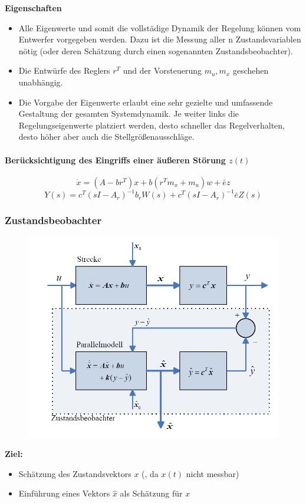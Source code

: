 \documentclass[10pt,a4paper]{article}
\begin{document}
\textbf{Eigenschaften}
\begin{itemize}
	\item Alle Eigenwerte und somit die vollstädige Dynamik der Regelung können vom Entwerfer vorgegeben werden. Dazu ist die Messung aller n Zustandsvariablen nötig (oder deren Schätzung durch einen sogenannten Zustandsbeobachter).
	\item Die Entwürfe des Reglers $r^T$ und der Vorsteuerung $m_u, m_x$ geschehen unabhängig.
	\item Die Vorgabe der Eigenwerte erlaubt eine sehr gezielte und umfassende Gestaltung der gesamten Systemdynamik. Je weiter links die Regelungseigenwerte platziert werden, desto schneller das Regelverhalten, desto höher	aber auch die Stellgrößenausschläge.
\end{itemize}

\paragraph{Berücksichtigung des Eingriffs einer äußeren Störung $z(t)$}
$$
	\dot x = (A - br^T) x + b (r^T m_x + m_u) w + \bar e z
$$
$$
	Y(s) = c^T(sI-A_r)^{-1}b_rW(s) + c^T(sI-A_r)^{-1}\bar eZ(s)
$$

\subsubsection{Zustandsbeobachter}
\begin{figure}[H]
	\includegraphics[width=0.7\columnwidth]{imgs/abb7_12.png}
\end{figure}

\textbf{Ziel:}
\begin{itemize}
	\item Schätzung des Zustandsvektors $x$ (, da $x(t)$ nicht messbar)
	\item Einführung eines Vektors $\hat x$ als Schätzung für $x$
\end{itemize} ~\\
\end{document}
